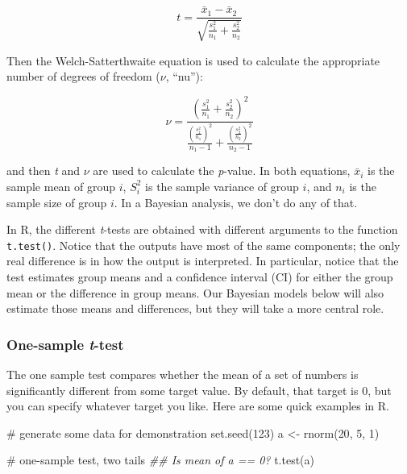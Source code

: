 \documentclass[
  13,
  letterpaper,
]{report}
\newenvironment{Shaded}{\begin{snugshade}}{\end{snugshade}}
\newcommand{\CommentTok}[1]{\textcolor[rgb]{0.37,0.37,0.37}{#1}}
\newcommand{\DecValTok}[1]{\textcolor[rgb]{0.68,0.00,0.00}{#1}}
\newcommand{\DocumentationTok}[1]{\textcolor[rgb]{0.37,0.37,0.37}{\textit{#1}}}
\newcommand{\FunctionTok}[1]{\textcolor[rgb]{0.28,0.35,0.67}{#1}}
\newcommand{\NormalTok}[1]{\textcolor[rgb]{0.00,0.23,0.31}{#1}}
\newcommand{\OtherTok}[1]{\textcolor[rgb]{0.00,0.23,0.31}{#1}}
\begin{document}
\[
t =
\frac{\bar{x}_1 - \bar{x}_2}
{\sqrt{\frac{s_1^2}{n_1} + \frac{s_2^2}{n_2}}}
\]

Then the Welch-Satterthwaite equation is used to calculate the
appropriate number of degrees of freedom (\(\nu\), ``nu''):

\[
\nu =
\frac{
\left(
\frac{s_1^2}{n_1} +
\frac{s_2^2}{n_2}
\right)^2
}{
\frac{\left(\frac{s_1^2}{n_1}\right)^2}{n_1-1}
+
\frac{\left(\frac{s_2^2}{n_2}\right)^2}{n_2-1}
}
\]

and then \emph{t} and \(\nu\) are used to calculate the \emph{p}-value.
In both equations, \({\bar{x}_i}\) is the sample mean of group \(i\),
\(S_i^2\) is the sample variance of group \(i\), and \(n_i\) is the
sample size of group \(i\). In a Bayesian analysis, we don't do any of
that.

In R, the different \emph{t}-tests are obtained with different arguments
to the function \texttt{t.test()}. Notice that the outputs have most of
the same components; the only real difference is in how the output is
interpreted. In particular, notice that the test estimates group means
and a confidence interval (CI) for either the group mean or the
difference in group means. Our Bayesian models below will also estimate
those means and differences, but they will take a more central role.

\subsubsection{\texorpdfstring{One-sample
\emph{t}-test}{One-sample t-test}}\label{sec-linear-onet}

The one sample test compares whether the mean of a set of numbers is
significantly different from some target value. By default, that target
is 0, but you can specify whatever target you like. Here are some quick
examples in R.

\begin{Shaded}
\begin{Highlighting}[]
\CommentTok{\# generate some data for demonstration}
\FunctionTok{set.seed}\NormalTok{(}\DecValTok{123}\NormalTok{)}
\NormalTok{a }\OtherTok{\textless{}{-}} \FunctionTok{rnorm}\NormalTok{(}\DecValTok{20}\NormalTok{, }\DecValTok{5}\NormalTok{, }\DecValTok{1}\NormalTok{)}

\CommentTok{\# one{-}sample test, two tails}
\DocumentationTok{\#\# Is mean of a == 0?}
\FunctionTok{t.test}\NormalTok{(a)}
\end{Highlighting}
\end{Shaded}
\end{document}
